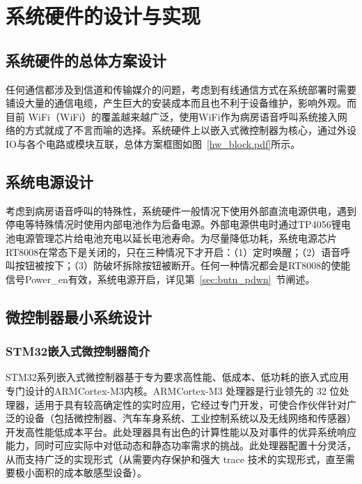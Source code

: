 
\chapter{系统硬件的设计与实现}\label{CH3}
\section{系统硬件的总体方案设计}
任何通信都涉及到信道和传输媒介的问题，考虑到有线通信方式在系统部署时需要铺设大量的通信电缆，产生巨大的安装成本而且也不利于设备维护，影响外观。而目前
\acrshort{WiFi}（\acrlong{WiFi}）的覆盖越来越广泛，使用\acrshort{WiFi}作为病房语音呼叫系统接入网络的方式就成了不言而喻的选择。系统硬件上以嵌入式微控制器为核心，通过外设IO与各个电路或模块互联，总体方案框图如图~\ref{hw_block.pdf}所示。

\section{系统电源设计}
考虑到病房语音呼叫的特殊性，系统硬件一般情况下使用外部直流电源供电，遇到停电等特殊情况时使用内部电池作为后备电源。外部电源供电时通过TP4056锂电池电源管理芯片给电池充电以延长电池寿命。为尽量降低功耗，系统电源芯片RT8008在常态下是关闭的，只在三种情况下才开启：（1）定时唤醒；（2）语音呼叫按钮被按下；（3）防破坏拆除按钮被断开。任何一种情况都会是RT8008的使能信号Power{\_}en有效，系统电源开启，详见第~\ref{sec:butn_pdwn}~节阐述。

\section{微控制器最小系统设计}
\subsection{STM32嵌入式微控制器简介}
STM32系{\cf}列嵌{\cf}入式{\cf}微控{\cf}制器{\cf}基于{\cf}专为{\cf}要求{\cf}高性{\cf}能、{\cf}低成{\cf}本、{\cf}低功{\cf}耗的{\cf}嵌入{\cf}式应{\cf}用专{\cf}门设{\cf}计的ARM\reg Cortex\reg -M3内核。ARM\reg Cortex\reg -M3 处{\cf}理器{\cf}是行{\cf}业领{\cf}先的{\cf} 3{\cf}2 {\cf}位处{\cf}理器{\cf}，适{\cf}用于{\cf}具有{\cf}较高{\cf}确定{\cf}性的{\cf}实时{\cf}应用{\cf}，它{\cf}经过{\cf}专门{\cf}开发{\cf}，可{\cf}使合{\cf}作伙{\cf}伴针{\cf}对广{\cf}泛的{\cf}设备{\cf}（包{\cf}括微{\cf}控制{\cf}器、{\cf}汽车{\cf}车身{\cf}系统{\cf}、工{\cf}业控{\cf}制系{\cf}统以{\cf}及无{\cf}线网{\cf}络和{\cf}传感{\cf}器）{\cf}开发{\cf}高性{\cf}能低{\cf}成本{\cf}平台{\cf}。此{\cf}处理{\cf}器具{\cf}有出{\cf}色的{\cf}计算{\cf}性能{\cf}以及{\cf}对事{\cf}件的{\cf}优异{\cf}系统{\cf}响应{\cf}能力{\cf}，同{\cf}时可{\cf}应实{\cf}际中{\cf}对低{\cf}动态{\cf}和静{\cf}态功{\cf}率需{\cf}求的{\cf}挑战{\cf}。此{\cf}处理{\cf}器配{\cf}置十{\cf}分灵{\cf}活，{\cf}从而{\cf}支持{\cf}广泛{\cf}的实{\cf}现形{\cf}式（{\cf}从需{\cf}要内{\cf}存保{\cf}护和{\cf}强大{\cf} t{\cf}ra{\cf}ce{\cf} 技{\cf}术的{\cf}实现{\cf}形式{\cf}，直{\cf}至需{\cf}要极{\cf}小面{\cf}积的{\cf}成本{\cf}敏感{\cf}型设备）。

